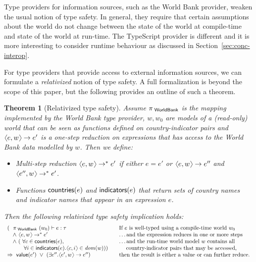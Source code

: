 \documentclass[submission,copyright,creativecommons]{eptcs}
\newcommand{\langl}{\begin{picture}(4.5,7)
\put(1.1,2.5){\rotatebox{60}{\line(1,0){5.5}}}
\put(1.1,2.5){\rotatebox{300}{\line(1,0){5.5}}}
\end{picture}}
\newcommand{\rangl}{\begin{picture}(4.5,7)
\put(.9,2.5){\rotatebox{120}{\line(1,0){5.5}}}
\put(.9,2.5){\rotatebox{240}{\line(1,0){5.5}}}
\end{picture}}
\newcommand{\ident}[1]{\textnormal{\sffamily #1}}
\newtheorem*{theorem*}{Theorem}
\begin{document}
Type providers for information sources, such as the World Bank provider, weaken the usual notion
of type safety. In general, they require that certain assumptions about the world do not change
between the state of the world at compile-time and state of the world at run-time. The TypeScript
provider is different and it is more interesting to consider runtime behaviour as discussed
in Section~\ref{sec:conc-interop}.

For type providers that provide access to external information sources, we can formulate a
\emph{relativized} notion of type safety. A full formalization is beyond the scope of this
paper, but the following provides an outline of such a theorem.

\begin{theorem*}[Relativized type safety]
Assume $\pi_{\ident{~WorldBank}}$ is the mapping implemented by the World Bank type provider,
$w, w_0$ are models of a (read-only) world that can be seen as functions defined on country-indicator
pairs and $\langl e, w \rangl \rightarrow e'$ is a one-step reduction on expressions that has
access to the World Bank data modelled by $w$. Then we define:

\begin{itemize}
\item
Multi-step reduction $\langl e, w \rangl \rightarrow^* e'$ if either $e=e'$
or $\langl e, w \rangl \rightarrow e''$ and $\langl e'', w \rangl \rightarrow^* e'$.
\item
Functions $\ident{countries}(e)$ and $\ident{indicators}(e)$ that return sets of
country names \\and indicator names that appear in an expression $e$.
\end{itemize}
%
Then the following \emph{relativized type safety} implication holds:
%
\begin{equation*}
\begin{array}{lcl}
(~~\pi_{\ident{~WorldBank}}~(w_0) \vdash e : \tau
  && \textnormal{If $e$ is well-typed using a compile-time world $w_0$}
\\
\quad \wedge~ \langl e, w \rangl \rightarrow^* e'
  && \textnormal{\ldots and the expression reduces in one or more steps}
\\
\quad \wedge~ (~\forall c \in \ident{countries}(e),
  && \textnormal{\ldots and the run-time world model $w$ contains all}
\\
       \qquad~~~ \forall i \in \ident{indicators}(e) . \langl c, i \rangl \in \mathit{dom}(w)))
  && \textnormal{\;\quad country-indicator pairs that may be accessed,}
\\
\Rightarrow ~\ident{value}(e') ~\vee~ (\exists e'' . \langl e', w \rangl \rightarrow e'')
  && \textnormal{then the result is either a value or can further reduce.}
\end{array}
\end{equation*}
\end{theorem*}
\end{document}
